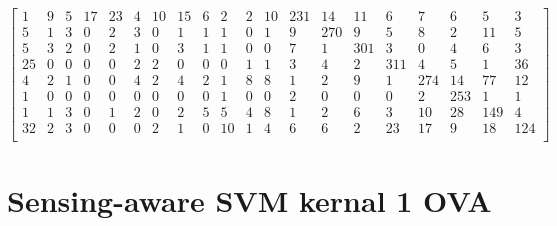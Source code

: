 \documentclass[a4paper, 11pt]{article}
\begin{document}
\[\begin{bmatrix}
     1  &   9  &   5  &  17   & 23  &   4 &   10  &  15  &   6  &   2  &   2 &   10  & 231  &  14  &  11  &   6  &   7  &   6  &   5  &   3 \\
     5  &   1  &   3  &   0   &  2  &   3 &    0  &   1  &   1  &   1  &   0 &    1  &   9  & 270  &   9  &   5  &   8  &   2  &  11  &   5 \\
     5  &   3  &   2  &   0   &  2  &   1 &    0  &   3  &   1  &   1  &   0 &    0  &   7  &   1  & 301  &   3  &   0  &   4  &   6  &   3 \\
    25  &   0  &   0  &   0   &  0  &   2 &    2  &   0  &   0  &   0  &   1 &    1  &   3  &   4  &   2  & 311  &   4  &   5  &   1  &  36 \\
     4  &   2  &   1  &   0   &  0  &   4 &    2  &   4  &   2  &   1  &   8 &    8  &   1  &   2  &   9  &   1  & 274  &  14  &  77  &  12 \\
     1  &   0  &   0  &   0   &  0  &   0 &    0  &   0  &   0  &   1  &   0 &    0  &   2  &   0  &   0  &   0  &   2  & 253  &   1  &   1 \\
     1  &   1  &   3  &   0   &  1  &   2 &    0  &   2  &   5  &   5  &   4 &    8  &   1  &   2  &   6  &   3  &  10  &  28  & 149  &   4 \\
    32  &   2  &   3  &   0   &  0  &   0 &    2  &   1  &   0  &  10  &   1 &    4  &   6  &   6  &   2  &  23  &  17  &   9  &  18  & 124 \\
\end{bmatrix}\]
\section{Sensing-aware SVM kernal 1 OVA}
\end{document}
